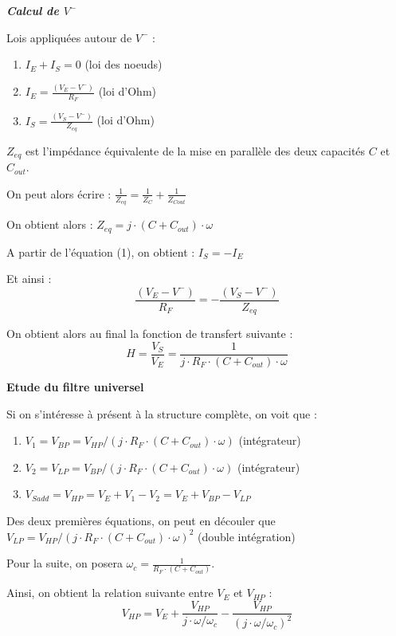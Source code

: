 \documentclass[a4paper,french]{paper}
\begin{document}
\textbf{\textit{Calcul de $V^-$}}

Lois appliquées autour de $V^-$ :
\begin{enumerate}
	\item $I_{E} + I_{S} = 0$ (loi des noeuds)
	\item $I_{E} = \frac{(V_{E} - V^-)}{R_F}$ (loi d'Ohm)
	\item $I_{S} = \frac{(V_{S} - V^-)}{Z_{eq}}$ (loi d'Ohm)
\end{enumerate}

$Z_{eq}$ est l'impédance équivalente de la mise en parallèle des deux capacités $C$ et $C_{out}$.

On peut alors écrire : $\frac{1}{Z_{eq}} = \frac{1}{Z_C} + \frac{1}{Z_{Cout}}$

On obtient alors : $Z_{eq} = j \cdot (C + C_{out}) \cdot \omega$

\medskip

A partir de l'équation (1), on obtient : $I_{S} = - I_{E}$

Et ainsi :
$$\frac{(V_{E} - V^-)}{R_F} = - \frac{(V_{S} - V^-)}{Z_{eq}}$$

\medskip

On obtient alors au final la fonction de transfert suivante : 
$$\boxed{H = \frac{V_S}{V_E} = \frac{1}{j \cdot R_F \cdot (C + C_{out}) \cdot \omega}}$$

\newpage

\textbf{Etude du filtre universel}

Si on s'intéresse à présent à la structure complète, on voit que :
\begin{enumerate}
	\item $V_1 = V_{BP} = V_{HP} / (j \cdot R_F \cdot (C + C_{out}) \cdot \omega)$ (intégrateur)
	\item $V_2 = V_{LP} = V_{BP} / (j \cdot R_F \cdot (C + C_{out}) \cdot \omega)$ (intégrateur)
	\item $V_{Sadd} = V_{HP} = V_E + V_1 - V_2 = V_E + V_{BP} - V_{LP}$
\end{enumerate}

Des deux premières équations, on peut en découler que $V_{LP} = V_{HP} / (j \cdot R_F \cdot (C + C_{out}) \cdot \omega)^2$ (double intégration)

\medskip

Pour la suite, on posera $\omega_c = \frac{1}{R_F \cdot (C + C_{out})}$.

Ainsi, on obtient la relation suivante entre $V_E$ et $V_{HP}$ :
$$ V_{HP} = V_E + \frac{V_{HP}}{j \cdot \omega / \omega_c} - \frac{V_{HP}}{(j \cdot \omega / \omega_c)^2}$$
\end{document}
